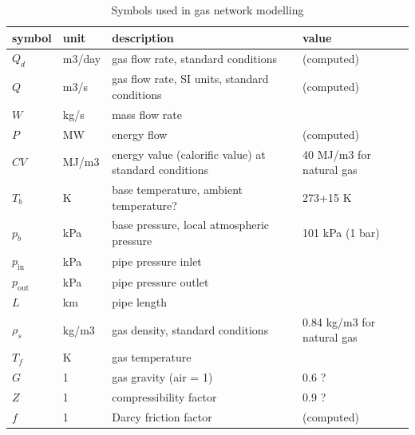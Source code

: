 \documentclass[12pt]{article}
\begin{document}
\begin{table}[]
\caption{Symbols used in gas network modelling}
\label{tab:gasnetworksymbols}
\begin{tabular}{llp{12em}p{8em}}
\hline 
symbol         & unit   & description                                           & value                      \\
\hline
$Q_d$          & m3/day & gas flow rate, standard conditions                    & (computed)                 \\
$Q$            & m3/s   & gas flow rate, SI units, standard conditions          & (computed)                 \\
$W$            & kg/s   & mass flow rate                                        &                            \\
$P$            & MW     & energy flow                                           & (computed)                 \\
$CV$           & MJ/m3  & energy value (calorific value) at standard conditions & 40 MJ/m3 for natural gas   \\
$T_b$          & K      & base temperature, ambient temperature?                & 273+15 K                   \\
$p_b$          & kPa    & base pressure, local atmospheric pressure             & 101 kPa (1 bar)            \\
$p_\text{in}$  & kPa    & pipe pressure inlet                                   &                            \\
$p_\text{out}$ & kPa    & pipe pressure outlet                                  &                            \\
$L$            & km     & pipe length                                           &                            \\
$\rho_s$       & kg/m3  & gas density, standard conditions                      & 0.84 kg/m3 for natural gas \\
$T_f$          & K      & gas temperature                                       &                            \\
$G$            & 1      & gas gravity (air = 1)                                 & 0.6 ?                      \\
$Z$            & 1      & compressibility factor                                & 0.9 ?                      \\
$f$            & 1      & Darcy friction factor                                 & (computed)                 \\

\end{tabular}
\end{table}
\end{document}
